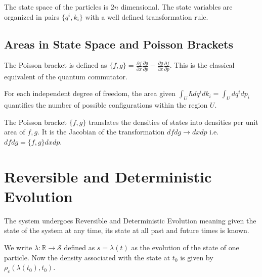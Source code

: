 \documentclass{article}
\begin{document}
\begin{prop}
	The state space of the particles is $2n$ dimensional. The state variables are organized in pairs $\{q^i, k_i\}$ with a well defined transformation rule.
\end{prop}

\subsection{Areas in State Space and Poisson Brackets}

\begin{defn}
	The Poisson bracket is defined as $\{f,g\} = \frac{\partial f}{\partial x}\frac{\partial g}{\partial p} - \frac{\partial g}{\partial x}\frac{\partial f}{\partial p}$. This is the classical equivalent of the quantum commutator.
\end{defn}
	
\begin{prop}
	For each independent degree of freedom, the area given $\int_U \hbar dq^i dk_i = \int_U dq^i dp_i$ quantifies the number of possible configurations within the region $U$.
\end{prop}

\begin{prop}
	The Poisson bracket $\{f, g\}$ translates the densities of states into densities per unit area of $f, g$. It is the Jacobian of the transformation $dfdg \rightarrow dxdp$ i.e. $dfdg = \{f,g\}dxdp$.
\end{prop}
	
\section{Reversible and Deterministic Evolution}

\begin{assump}
	The system undergoes Reversible and Deterministic Evolution meaning given the state of the system at any time, its state at all past and future times is known.
\end{assump}

\begin{defn}
	We write $\lambda: \mathbb{R} \rightarrow \mathcal{S}$ defined as $s = \lambda(t)$ as the evolution of the state of one particle. Now the density associated with the state at $t_0$ is given by $\rho_c(\lambda(t_0),t_0)$.
\end{defn}

\end{document}
